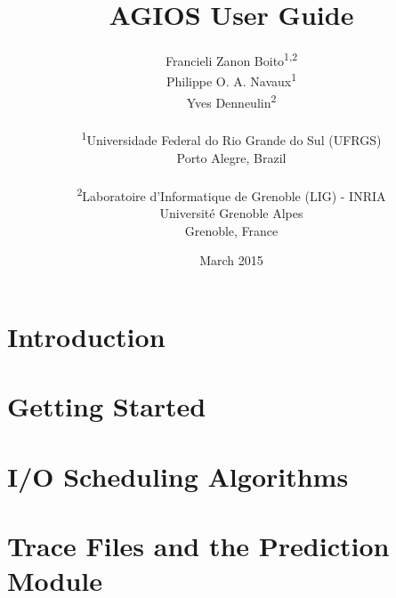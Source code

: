 \documentclass[10pt]{report}
\begin{document}
%
\title{AGIOS User Guide}


\author{
Francieli Zanon Boito\textsuperscript{1,2}\\Philippe O. A. Navaux\textsuperscript{1}\\Yves Denneulin\textsuperscript{2}\\\\\textsuperscript{1}Universidade Federal do Rio Grande do Sul (UFRGS)\\Porto Alegre, Brazil\\\\\textsuperscript{2}Laboratoire d'Informatique de Grenoble (LIG) - INRIA\\Universit\'{e} Grenoble Alpes\\Grenoble, France}

\date{March 2015}

\maketitle

\tableofcontents


\chapter{Introduction}



\chapter{Getting Started} \label{chapter:starting}



\chapter{I/O Scheduling Algorithms} \label{chapter:algorithms}



\chapter{Trace Files and the Prediction Module} \label{chapter:trace}
\end{document}
